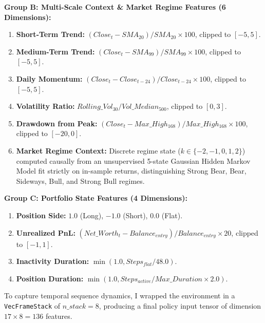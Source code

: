 \documentclass[11pt,a4paper]{article}
\begin{document}
\textbf{Group B: Multi-Scale Context \& Market Regime Features (6 Dimensions):}
\begin{enumerate}[leftmargin=2em, start=8]
    \item \textbf{Short-Term Trend:} $(Close_t - SMA_{20}) / SMA_{20} \times 100$, clipped to $[-5, 5]$.
    \item \textbf{Medium-Term Trend:} $(Close_t - SMA_{99}) / SMA_{99} \times 100$, clipped to $[-5, 5]$.
    \item \textbf{Daily Momentum:} $(Close_t - Close_{t-24}) / Close_{t-24} \times 100$, clipped to $[-5, 5]$.
    \item \textbf{Volatility Ratio:} $Rolling\_Vol_{30} / Vol\_Median_{500}$, clipped to $[0, 3]$.
    \item \textbf{Drawdown from Peak:} $(Close_t - Max\_High_{168}) / Max\_High_{168} \times 100$, clipped to $[-20, 0]$.
    \item \textbf{Market Regime Context:} Discrete regime state ($k \in \{-2, -1, 0, 1, 2\}$) computed causally from an unsupervised 5-state Gaussian Hidden Markov Model fit strictly on in-sample returns, distinguishing Strong Bear, Bear, Sideways, Bull, and Strong Bull regimes.
\end{enumerate}

\textbf{Group C: Portfolio State Features (4 Dimensions):}
\begin{enumerate}[leftmargin=2em, start=14]
    \item \textbf{Position Side:} $1.0$ (Long), $-1.0$ (Short), $0.0$ (Flat).
    \item \textbf{Unrealized PnL:} $(Net\_Worth_t - Balance_{entry}) / Balance_{entry} \times 20$, clipped to $[-1, 1]$.
    \item \textbf{Inactivity Duration:} $\min(1.0, Steps_{flat} / 48.0)$.
    \item \textbf{Position Duration:} $\min(1.0, Steps_{active} / Max\_Duration \times 2.0)$.
\end{enumerate}

To capture temporal sequence dynamics, I wrapped the environment in a \texttt{VecFrameStack} of $n\_stack = 8$, producing a final policy input tensor of dimension $17 \times 8 = 136$ features.
\end{document}
